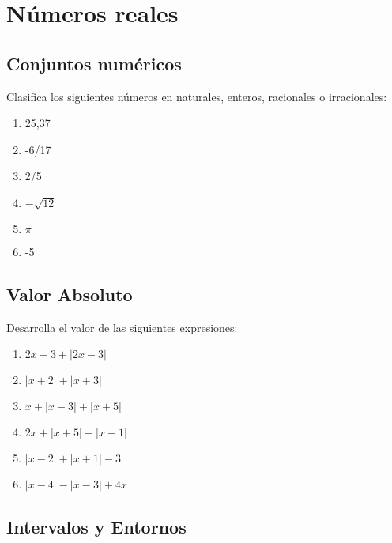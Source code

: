 \chapter{Números reales}

\section{Conjuntos numéricos}

\Exercicio Clasifica los siguientes números en naturales, enteros, racionales o irracionales:

\begin{enumerate}[topsep=0pt]

	\item 25,37

	\item -6/17

	\item 2/5

	\item $-\sqrt{12}$

	\item $ \pi	$

	\item -5

\end{enumerate}


\section{Valor Absoluto}

\Exercicio Desarrolla el valor de las siguientes expresiones:

\begin{enumerate}[topsep=0pt]

	\item $2x - 3 + |2x-3|$

	\item $|x+2| + |x+3|$

	\item $x +|x-3| + |x+5|$
	\item $2x + |x+5| - |x-1|$
	\item $|x-2| + |x+1| - 3$
	\item $|x-4| - |x-3| + 4x$
\end{enumerate}


\section{Intervalos y Entornos}

